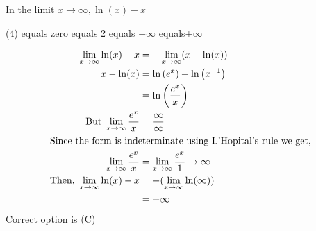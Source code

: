 \begin{questions}
\begin{minipage}{\textwidth}
	\question In the limit $x \rightarrow \infty, \ln (x)-x$
\end{minipage}
\begin{tasks}(4)
	\task[\textbf{A.}] equals zero
	\task[\textbf{B.}]equals 2
	\task[\textbf{C.}]equals $-\infty$
	\task[\textbf{D.}] equals$+\infty$
\end{tasks}
\begin{answer}
	\begin{align*}
	\lim _{x \rightarrow \infty} \ln(x)-x&=-\lim _{x \rightarrow \infty}  (x-\ln (x))\\\
	x-\ln (x) 
	&=\ln \left(e^{x}\right)+\ln \left(x^{-1}\right) \\
	&=\ln \left(\frac{e^{x}}{x}\right)\\\text{But }\lim _{x \rightarrow \infty} \frac{e^{x}}{x}&=\frac{\infty}{\infty}\\
	\intertext{Since the form is indeterminate using L'Hopital's rule we get,}
	\lim _{x \rightarrow \infty} \frac{e^{x}}{x}&=\lim _{x \rightarrow \infty} \frac{e^{x}}{1} \rightarrow \infty\\
	\text{Then,}\ \lim _{x \rightarrow \infty} \ln(x)-x&=-(\lim _{x \rightarrow \infty} \ln(\infty))\\&=-\infty
	\end{align*}
	Correct option is (C)
\end{answer}


\end{questions}
